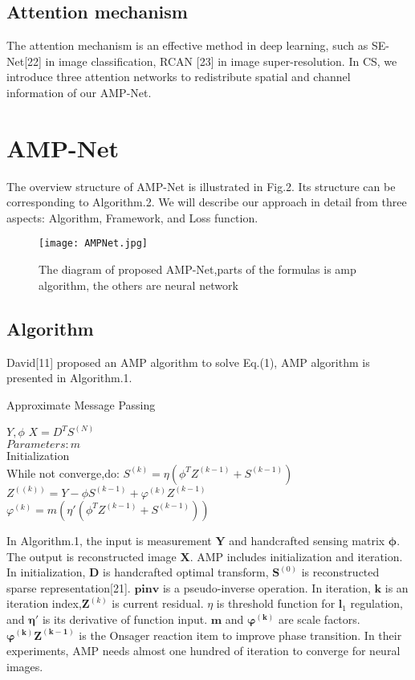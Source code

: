\documentclass[conference]{IEEEtran}
\begin{document}
\subsection{Attention mechanism}
The attention mechanism is an effective method in deep learning, such as SE-Net[22] in image classification, RCAN [23]  in image super-resolution. In CS, we introduce three attention networks to redistribute spatial and channel information of our AMP-Net.
\section{AMP-Net}
The overview structure of AMP-Net is illustrated in Fig.2. Its structure can be corresponding to Algorithm.2.  We will describe our approach in detail from three aspects: Algorithm, Framework, and  Loss function.
\begin{figure*}[t]
\centering
\texttt{[image: AMPNet.jpg]} \caption{The diagram of proposed AMP-Net,parts of the formulas is amp algorithm, the others are neural network}
\label{fig:AMPNet} \end{figure*}
\subsection{Algorithm}
David[11] proposed an AMP algorithm to solve Eq.(1), AMP algorithm is presented in Algorithm.1.
\begin{algorithm}
\caption{Approximate Message Passing}
\label{alg:Approximate Message Passing}
\begin{algorithmic}
\REQUIRE $Y, \phi$
\ENSURE $X=D^TS^{(N)}$
\\$Parameters:m$ 
\\Initialization
{} 
\\While not converge,do:
       \STATE $  S^{(k)}=\eta(\phi^T Z^{(k-1)}+S^{(k-1)})$
       \STATE $  Z^((k) )=Y- \phi S^{(k-1)}+ \varphi^{(k)} Z^{(k-1)}$
        \STATE $  \varphi^{(k)}=m(\eta{'}(\phi^{T} Z^{(k-1)}+S^{(k-1)}))$
        \\

\end{algorithmic}
\end{algorithm}
In Algorithm.1, the input is measurement $\bm{Y}$ and handcrafted sensing matrix $\bm{\phi}$. The output is reconstructed image $\bm{X}$.
AMP includes initialization and iteration. In initialization, $\bm{D}$ is handcrafted optimal transform, $\bm S^{(0)}$ is reconstructed sparse representation[21]. $\bm{pinv}$ is a pseudo-inverse operation. 
In iteration, $\bm{k}$ is an iteration index,$\bm Z^{(k)}$ is current residual. ${\eta}$ is threshold function for  $\bm{l}_1$  regulation, and $\bm{\eta{'}}$ is its derivative of function input. $\bm{m}$ and  $\bm{\varphi^{(k)}}$ are scale factors. $\bm{\varphi^{(k)} Z^{(k-1)}}$ is the Onsager reaction item to improve phase transition. In their experiments, AMP needs almost one hundred of iteration to converge for neural images. 
\end{document}
